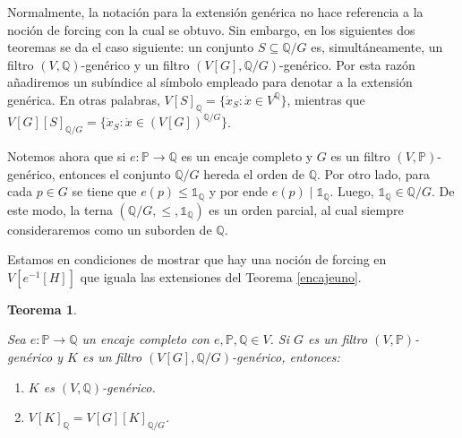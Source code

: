 \documentclass[11pt]{unam_tesis1}
\theoremstyle{MyThmStyle}
\theoremstyle{definition}
\theoremstyle{plain}
\newtheorem{theorem}[definition]{Teorema}
\theoremstyle{remark}
\let\leq\leqslant
\begin{document}
Normalmente, la notaci\'on para la extensi\'on gen\'erica no hace referencia a la noci\'on de forcing con la cual se obtuvo. Sin embargo, en los siguientes dos teoremas se da el caso siguiente: un conjunto $S \subseteq \mathbb Q/G$ es, simult\'aneamente, un filtro $(V,\mathbb Q)$-gen\'erico y un filtro $(V[G],\mathbb Q/G)$-gen\'erico. Por esta raz\'on a\~nadiremos un sub\'indice al s\'imbolo empleado para denotar a la extensi\'on gen\'erica. En otras palabras, $V[S]_\mathbb Q = \{ \dot x_S : \dot x \in V^{\mathbb Q} \}$, mientras que $V[G][S]_{\mathbb Q/G} = \{ \dot x_S : \dot x \in (V[G])^{\mathbb Q/G} \}$.

Notemos ahora que si $e:\mathbb P\to \mathbb Q$ es un encaje completo y $G$ es un filtro $(V,\mathbb P)$-gen\'erico, entonces el conjunto $\mathbb Q/G$ hereda el orden de $\mathbb Q$. Por otro lado, para cada $p\in G$ se tiene que $e(p)\leq \mathds 1_{\mathbb Q}$ y por ende $e(p)\mid \mathds 1_{\mathbb Q}$. Luego, $\mathds 1_{\mathbb Q}\in \mathbb Q/G$. De este modo, la terna $(\mathbb Q/G,\leq,\mathds 1_{\mathbb Q})$ es un orden parcial, al cual siempre consideraremos como un suborden de $\mathbb Q$.

Estamos en condiciones de mostrar que hay una noci\'on de forcing en $V[e^{-1}[H]]$ que iguala las extensiones del Teorema \ref{encajeuno}.

\begin{theorem}\label{lorestante}

Sea $e:\mathbb P \rightarrow \mathbb Q$ un encaje completo con $e,\mathbb P,\mathbb Q\in V$. Si $G$ es un filtro $(V,\mathbb P)$-gen\'erico y $K$ es un filtro $(V[G], \mathbb Q/G)$-gen\'erico, entonces:

\begin{enumerate}

\item $K$ es $(V, \mathbb Q)$-gen\'erico.
\item $V[K]_{\mathbb Q}=V[G][K]_{\mathbb Q/G}$.

\end{enumerate}

\end{theorem}
\end{document}
